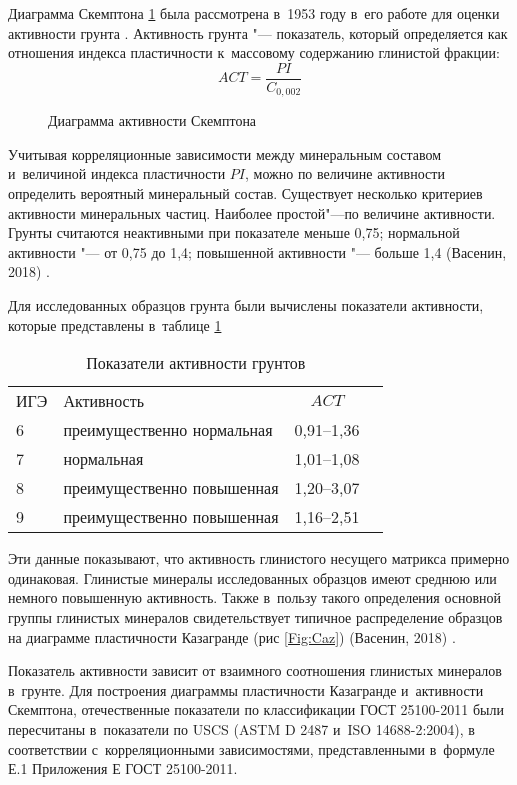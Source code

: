 Диаграмма Скемптона \ref{Fig:Skt} была рассмотрена в~1953 году в~его работе для оценки активности грунта \cite{skempton1953}.
Активность грунта "--- показатель, который определяется как отношения индекса пластичности к~массовому содержанию глинистой фракции:
$$ ACT = \frac{PI}{C_{0,002}}$$

\begin{figure}[ht]
    \centering
    \small
    
    \caption{Диаграмма активности Скемптона}
    \label{Fig:Skt}
  \end{figure}

Учитывая корреляционные зависимости между минеральным составом и~величиной индекса пластичности $PI$, можно по величине активности определить вероятный минеральный состав. Существует несколько критериев активности минеральных частиц. Наиболее простой"---по величине активности. 
Грунты считаются неактивными при показателе меньше 0,75; нормальной активности "--- от 0,75 до 1,4; повышенной активности "--- больше 1,4 (Васенин, 2018) \cite{vasenin2018}.

Для исследованных образцов грунта были вычислены показатели активности, которые представлены в~таблице \ref{tab:ak}

\begin{table}[ht]
    \centering
    \small
    \caption{Показатели активности грунтов} \label{tab:ak}
    \renewcommand*{\arraystretch}{1.2}
    \begin{tabular}{p{}lcc}
    ИГЭ & Активность &  $ACT$ \\
    6 \dotfill &  преимущественно нормальная & 0,91--1,36 \\
    7 \dotfill &  нормальная & 1,01--1,08 \\
    8 \dotfill &  преимущественно повышенная & 1,20--3,07 \\
    9 \dotfill &  преимущественно повышенная & 1,16--2,51\\
    \end{tabular}
\end{table}
    

Эти данные показывают, что активность глинистого несущего матрикса примерно одинаковая. Глинистые минералы исследованных образцов имеют среднюю или немного повышенную активность.
Также в~пользу такого определения основной группы глинистых минералов свидетельствует типичное распределение образцов на диаграмме пластичности Казагранде (рис \ref{Fig:Caz}) (Васенин, 2018) \cite{vasenin2018}.

Показатель активности зависит от взаимного соотношения глинистых минералов в~грунте.
Для построения диаграммы пластичности Казагранде и~активности Скемптона, отечественные показатели по классификации ГОСТ 25100-2011 были пересчитаны в~показатели по USCS (ASTM D 2487 и~ISO 14688-2:2004), 
в соответствии с~корреляционными зависимостями, представленными в~формуле Е.1 Приложения Е ГОСТ 25100-2011.








